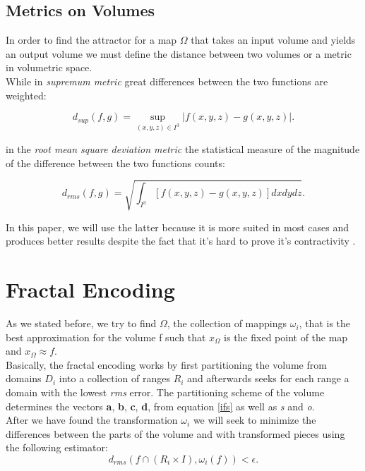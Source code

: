 \documentclass[10pt, conference, compsocconf]{IEEEtran}
\begin{document}
\subsection{Metrics on Volumes}

In order to find the attractor for a map $\Omega$ that takes an input volume and yields an output volume we must define the distance between two volumes or a metric in volumetric space.~\\

While in \emph{supremum metric} great differences between the two functions are weighted:

\begin{equation}\label{dsup}
d_{sup}(f,g) = \sup_{(x,y,z)\in I^{3}}|f(x,y,z) - g(x,y,z)|.
\end{equation}

\begin{flushleft}
in the \emph{root mean square deviation metric} the statistical measure of the magnitude of the difference between the two functions counts:
\end{flushleft}

\begin{equation}\label{drms}
d_{rms}(f,g) = \sqrt{\int_{I^{3}}\left[ f(x,y,z) - g(x,y,z)\right]dxdydz}.
\end{equation}

In this paper, we will use the latter because it is more suited in most cases and produces better results despite the fact that it's hard to prove it's contractivity \cite{Hur93}.~\\

\section{Fractal Encoding}
As we stated before, we try to find $\Omega$, the collection of mappings $\omega_i$, that is the best approximation for the volume f such that $x_\Omega$ is the fixed point of the map and $x_\Omega \approx f$. ~\\

Basically, the fractal encoding works by first partitioning the volume from domains $D_i$ into a collection of ranges $R_i$ and afterwards seeks for each range a domain with the lowest \emph{rms} error. The partitioning scheme of the volume determines the vectors \textbf{a}, \textbf{b}, \textbf{c}, \textbf{d}, from equation \ref{ifs} as well as \emph{s} and \emph{o}.~\\

After we have found the transformation $\omega_i$ we will seek to minimize the differences between the parts of the volume and with transformed pieces using the following estimator:
\begin{equation}
d_{rms}(f\cap(R_i \times I), \omega_i(f)) < \epsilon.
\end{equation}
\end{document}
